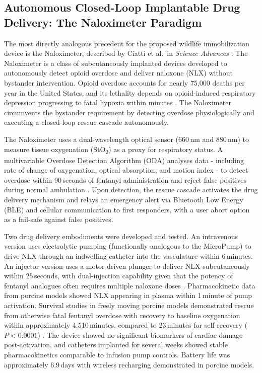 \documentclass[12pt,a4paper]{article}
\begin{document}
    \subsection{Autonomous Closed-Loop Implantable Drug Delivery: The Naloximeter Paradigm}

    The most directly analogous precedent for the proposed wildlife immobilization device is
    the Naloximeter, described by Ciatti et al.\ in \textit{Science Advances} \cite{ciatti2024}.
    The Naloximeter is a class of subcutaneously implanted devices developed to autonomously
    detect opioid overdose and deliver naloxone (NLX) without bystander intervention. Opioid
    overdose accounts for nearly 75,000 deaths per year in the United States, and its lethality
    depends on opioid-induced respiratory depression progressing to fatal hypoxia within
    minutes \cite{ciatti2024}. The Naloximeter circumvents the bystander requirement by
    detecting overdose physiologically and executing a closed-loop rescue cascade autonomously.

    The Naloximeter uses a dual-wavelength optical sensor (660\,nm and 880\,nm) to measure
    tissue oxygenation (StO\textsubscript{2}) as a proxy for respiratory status. A multivariable
    Overdose Detection Algorithm (ODA) analyses data - including rate of change of
    oxygenation, optical absorption, and motion index - to detect overdose within 90\,seconds
    of fentanyl administration and reject false positives during normal ambulation \cite{ciatti2024}.
    Upon detection, the rescue cascade activates the drug delivery mechanism and relays an
    emergency alert via Bluetooth Low Energy (BLE) and cellular communication to first
    responders, with a user abort option as a fail-safe against false positives.

    Two drug delivery embodiments were developed and tested. An intravenous version uses
    electrolytic pumping (functionally analogous to the MicroPump) to drive NLX through an
    indwelling catheter into the vasculature within 6\,minutes. An injector version uses a
    motor-driven plunger to deliver NLX subcutaneously within 25\,seconds, with dual-injection
    capability given that the potency of fentanyl analogues often requires multiple naloxone
    doses \cite{ciatti2024}. Pharmacokinetic data from porcine models showed NLX appearing in
    plasma within 1\,minute of pump activation. Survival studies in freely moving porcine models
    demonstrated rescue from otherwise fatal fentanyl overdose with recovery to baseline
    oxygenation within approximately 4.510\,minutes, compared to 23\,minutes for
    self-recovery ($P < 0.0001$) \cite{ciatti2024}. The device showed no significant biomarkers
    of cardiac damage post-activation, and catheters implanted for several weeks showed stable
    pharmacokinetics comparable to infusion pump controls. Battery life was approximately
    6.9\,days with wireless recharging demonstrated in porcine models.
\end{document}
